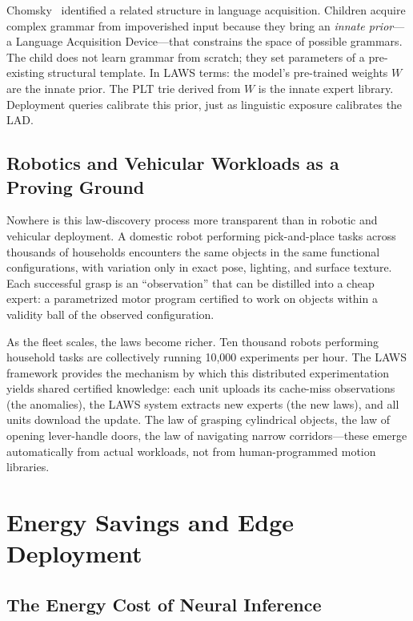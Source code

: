 \documentclass[11pt]{article}
\begin{document}
Chomsky~\cite{chomsky1965} identified a related structure in language acquisition.
Children acquire complex grammar from impoverished input because they bring
an \emph{innate prior}---a Language Acquisition Device---that constrains the
space of possible grammars.  The child does not learn grammar from scratch;
they set parameters of a pre-existing structural template.  In LAWS terms:
the model's pre-trained weights $W$ are the innate prior.  The PLT trie derived
from $W$ is the innate expert library.  Deployment queries calibrate this prior,
just as linguistic exposure calibrates the LAD.

\subsection{Robotics and Vehicular Workloads as a Proving Ground}

Nowhere is this law-discovery process more transparent than in robotic and
vehicular deployment.  A domestic robot performing pick-and-place tasks across
thousands of households encounters the same objects in the same functional
configurations, with variation only in exact pose, lighting, and surface
texture.  Each successful grasp is an ``observation'' that can be distilled
into a cheap expert: a parametrized motor program certified to work on objects
within a validity ball of the observed configuration.

As the fleet scales, the laws become richer.  Ten thousand robots performing
household tasks are collectively running 10,000 experiments per hour.  The LAWS
framework provides the mechanism by which this distributed experimentation
yields shared certified knowledge: each unit uploads its cache-miss observations
(the anomalies), the LAWS system extracts new experts (the new laws), and all
units download the update.  The law of grasping cylindrical objects, the law of
opening lever-handle doors, the law of navigating narrow corridors---these
emerge automatically from actual workloads, not from human-programmed motion
libraries.

\section{Energy Savings and Edge Deployment}
\label{sec:energy}

\subsection{The Energy Cost of Neural Inference}
\end{document}
